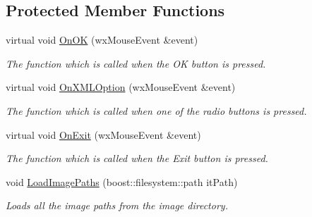 \subsection*{Protected Member Functions}
\begin{DoxyCompactItemize}
\item 
virtual void \hyperlink{classChoiceFrame_a151614cb9a4695ce3448dffd7daf63ad}{OnOK} (wxMouseEvent \&event)
\begin{DoxyCompactList}\small\item\em The function which is called when the OK button is pressed. \item\end{DoxyCompactList}\item 
virtual void \hyperlink{classChoiceFrame_add2d86011be65c8c5ed74984ca845270}{OnXMLOption} (wxMouseEvent \&event)
\begin{DoxyCompactList}\small\item\em The function which is called when one of the radio buttons is pressed. \item\end{DoxyCompactList}\item 
virtual void \hyperlink{classChoiceFrame_a6016387f6d12175fd733832f83d9320e}{OnExit} (wxMouseEvent \&event)
\begin{DoxyCompactList}\small\item\em The function which is called when the Exit button is pressed. \item\end{DoxyCompactList}\item 
void \hyperlink{classChoiceFrame_ad6849e2dad8d91aa24199edab1e63f34}{LoadImagePaths} (boost::filesystem::path itPath)
\begin{DoxyCompactList}\small\item\em Loads all the image paths from the image directory. \item\end{DoxyCompactList}\end{DoxyCompactItemize}
